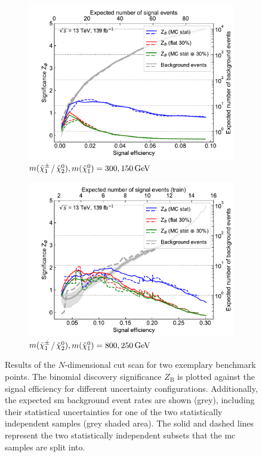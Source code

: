 \begin{figure}
	\centering
	\begin{subfigure}[b]{0.5\linewidth}
		\centering\includegraphics[width=1.0\textwidth]{N-1_cut_scan/z_vs_effs_300_150.pdf}
		\caption{$m(\tilde{\chi}_1^\pm$/$\neutr), m(\lsp) =  300, \SI{150}{\GeV}$}
	\end{subfigure}\hfill
	\begin{subfigure}[b]{0.5\linewidth}
		\centering\includegraphics[width=1.0\textwidth]{N-1_cut_scan/z_vs_effs_800_250.pdf}
		\caption{$m(\tilde{\chi}_1^\pm$/$\neutr), m(\lsp) =  800, \SI{250}{\GeV}$}
	\end{subfigure}\hfill

	\caption[N-dimensional cut scan results]{Results of the $N$-dimensional cut scan for two exemplary benchmark points. The binomial discovery significance $Z_\mathrm{B}$ is plotted against the signal efficiency for different uncertainty configurations. Additionally, the expected \gls{sm} background event rates are shown (grey), including their statistical uncertainties for one of the two statistically independent samples (grey shaded area). The solid and dashed lines represent the two statistically independent subsets that the \gls{mc} samples are split into.}
	\label{fig:results_z_vs_eff}
\end{figure}

